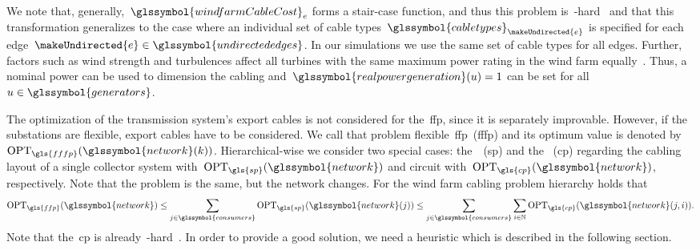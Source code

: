 We note that, generally,~$\glssymbol{windfarmCableCost}_\edge$ forms a
stair-case function, and thus this problem is~\NP-hard~\parencite{20084889} and
that this transformation generalizes to the case where an individual set of
cable types~$\glssymbol{cabletypes}_{\makeUndirected{\edge}}$ is specified for
each edge~$\makeUndirected{\edge}\in\glssymbol{undirectededges}$.  In our
simulations we use the same set of cable types for all edges. Further, factors
such as wind strength and turbulences affect all turbines with the same maximum
power rating in the wind farm equally~\parencite{online:offshore-windfarm-db}.
Thus, a nominal power can be used to dimension the cabling and~$
\glssymbol{realpowergeneration}(\vertexa) = 1$ can be set for
all~$\vertexa\in\glssymbol{generators}$.

The optimization of the transmission system's export cables is not considered
for the~\gls{ffp}, since it is separately improvable. However, if the
substations are flexible, export cables have to be considered. We call that
problem flexible~\gls{ffp}~(\gls{fffp}) and its optimum value is denoted
by~$\opt_{\gls{fffp}}(\glssymbol{network}(k))$. Hierarchical-wise we consider
two special cases: the~~(\gls{sp}) and
the~ (\gls{cp}) regarding the cabling layout of a single
collector system with~$\opt_{\gls{sp}}(\glssymbol{network})$ and circuit
with~$\opt_{\gls{cp}}(\glssymbol{network})$, respectively. Note that the problem
is the same, but the network changes.
%
For the wind farm cabling problem hierarchy holds that 
\[
\opt_{\gls{ffp}}(\glssymbol{network})
\leq
\sum_{\substation \in \glssymbol{consumers}} 
\opt_{\gls{sp}}(\glssymbol{network}(\substation))
\leq 
\sum_{\substation \in \glssymbol{consumers}}
\sum_{\circuit \in \naturals}
\opt_{\gls{cp}}(\glssymbol{network}(\substation, \circuit)).
\]
Note that the~\gls{cp} is already~\NP-hard~\parencite{20084889}. 
% 
In order to provide a good solution, we need a heuristic which is described in
the following section.
% 
